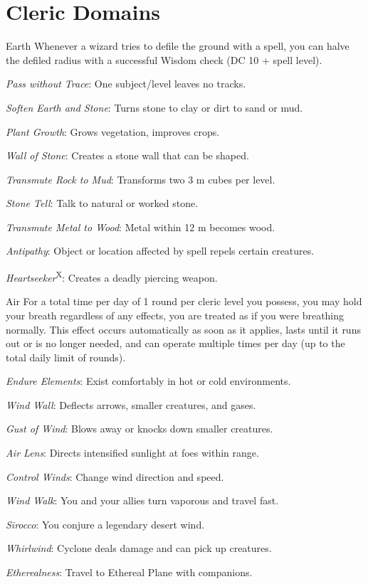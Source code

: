 \vskip15cm
\section{Cleric Domains}

{Earth}
{Whenever a wizard tries to defile the ground with a spell, you can halve the defiled radius with a successful Wisdom check (DC 10 + spell level).}
{
	\item \textit{Pass without Trace}: One subject/level leaves no tracks.
	\item \textit{Soften Earth and Stone}: Turns stone to clay or dirt to sand or mud.
	\item \textit{Plant Growth}: Grows vegetation, improves crops.
	\item \textit{Wall of Stone}: Creates a stone wall that can be shaped.
	\item \textit{Transmute Rock to Mud}: Transforms two 3 m cubes per level.
	\item \textit{Stone Tell}: Talk to natural or worked stone.
	\item \textit{Transmute Metal to Wood}: Metal within 12 m becomes wood.
	\item \textit{Antipathy}: Object or location affected by spell repels certain creatures.
	\item \textit{Heartseeker}\textsuperscript{X}: Creates a deadly piercing weapon.
}

{Air}
{For a total time per day of 1 round per cleric level you possess, you may hold your breath regardless of any effects, you are treated as if you were breathing normally. This effect occurs automatically as soon as it applies, lasts until it runs out or is no longer needed, and can operate multiple times per day (up to the total daily limit of rounds).}
{
	\item \textit{Endure Elements}: Exist comfortably in hot or cold environments.
	\item \textit{Wind Wall}: Deflects arrows, smaller creatures, and gases.
	\item \textit{Gust of Wind}: Blows away or knocks down smaller creatures.
	\item \textit{Air Lens}: Directs intensified sunlight at foes within range.
	\item \textit{Control Winds}: Change wind direction and speed.
	\item \textit{Wind Walk}: You and your allies turn vaporous and travel fast.
	\item \textit{Sirocco}: You conjure a legendary desert wind.
	\item \textit{Whirlwind}: Cyclone deals damage and can pick up creatures.
	\item \textit{Etherealness}: Travel to Ethereal Plane with companions.
}


